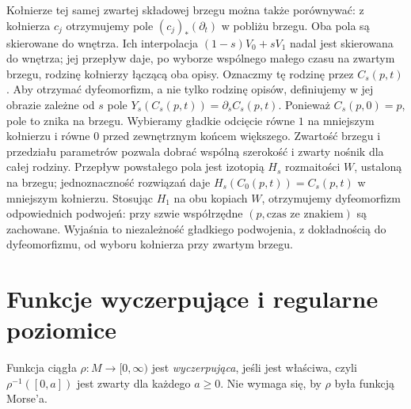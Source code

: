 Kołnierze tej samej zwartej
składowej brzegu można także
porównywać: z kołnierza $c_j$
otrzymujemy pole
$(c_j)_*(\partial_t)$ w pobliżu
brzegu. Oba pola są skierowane
do wnętrza. Ich interpolacja
$(1-s)V_0+sV_1$ nadal jest
skierowana do wnętrza;
jej przepływ daje, po wyborze
wspólnego małego czasu na
zwartym brzegu, rodzinę
kołnierzy łączącą oba opisy.
Oznaczmy tę rodzinę przez $C_s(p,t)$. Aby otrzymać
dyfeomorfizm, a nie tylko rodzinę opisów, definiujemy
w jej obrazie zależne od $s$ pole
$Y_s(C_s(p,t))=\partial_s C_s(p,t)$.
Ponieważ $C_s(p,0)=p$, pole to znika na brzegu.
Wybieramy gładkie odcięcie równe $1$ na mniejszym
kołnierzu i równe $0$ przed zewnętrznym końcem większego.
Zwartość brzegu i przedziału parametrów pozwala dobrać
wspólną szerokość i zwarty nośnik dla całej rodziny.
Przepływ powstałego pola jest izotopią $H_s$ rozmaitości
$W$, ustaloną na brzegu; jednoznaczność rozwiązań daje
$H_s(C_0(p,t))=C_s(p,t)$ w mniejszym kołnierzu.
Stosując $H_1$ na obu kopiach $W$, otrzymujemy
dyfeomorfizm odpowiednich podwojeń: przy szwie
współrzędne $(p,\text{czas ze znakiem})$ są zachowane.
Wyjaśnia to niezależność gładkiego podwojenia, z dokładnością
do dyfeomorfizmu, od wyboru kołnierza przy zwartym brzegu.

\section{Funkcje wyczerpujące i regularne poziomice}
\label{sec:wyczerpujace-15}

\begin{definicja}
\label{def:wyczerpujaca-15}
Funkcja ciągła $\rho:M\to[0,\infty)$ jest
\emph{wyczerpująca}, jeśli jest właściwa,
czyli $\rho^{-1}([0,a])$ jest zwarty
dla każdego $a\geq0$.
Nie wymaga się, by $\rho$ była
funkcją Morse'a.
\end{definicja}

